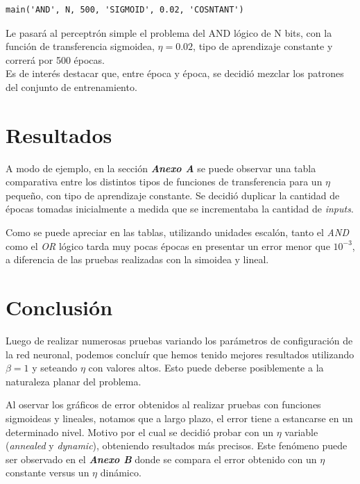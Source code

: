 \documentclass[%
    final,
    reprint,
    notitlepage,
    narroweqnarray,
    inline,
    twoside,
    invited
    ]{ieee}
\begin{document}
\begin{verbatim}
main('AND', N, 500, 'SIGMOID', 0.02, 'COSNTANT')
\end{verbatim}

Le pasará al perceptrón simple el problema del AND lógico de N bits, con la función de transferencia sigmoidea, $\eta=0.02$, tipo de aprendizaje constante y correrá por 500 épocas.\\
Es de interés destacar que, entre época y época, se decidió mezclar los patrones del conjunto de entrenamiento.

\section{Resultados}

\par A modo de ejemplo, en la sección \textit{\textbf{Anexo A}} se puede observar una tabla comparativa entre los distintos tipos de funciones de transferencia para un $\eta$ pequeño, con tipo de aprendizaje constante. Se decidió duplicar la cantidad de épocas tomadas inicialmente a medida que se incrementaba la cantidad de \textit{inputs}.

\par Como se puede apreciar en las tablas, utilizando unidades escalón, tanto el \textit{AND} como el \textit{OR} lógico tarda muy pocas épocas en presentar un error menor que $10^{-3}$, a diferencia de las pruebas realizadas con la simoidea y lineal.

\section{Conclusión}

\PARstart Luego de realizar numerosas pruebas variando los parámetros de configuración de la red neuronal, podemos concluír que hemos tenido mejores resultados utilizando $\beta=1$ y seteando $\eta$ con valores altos. Esto puede deberse posiblemente a la naturaleza planar del problema.

\par Al oservar los gráficos de error obtenidos al realizar pruebas con funciones sigmoideas y lineales, notamos que a largo plazo, el error tiene a estancarse en un determinado nivel. Motivo por el cual se decidió probar con un $\eta$ variable (\textit{annealed} y \textit{dynamic}), obteniendo resultados más precisos. Este fenómeno puede ser observado en el \textit{\textbf{Anexo B}} donde se compara el error obtenido con un $\eta$ constante versus un $\eta$ dinámico.
\end{document}

